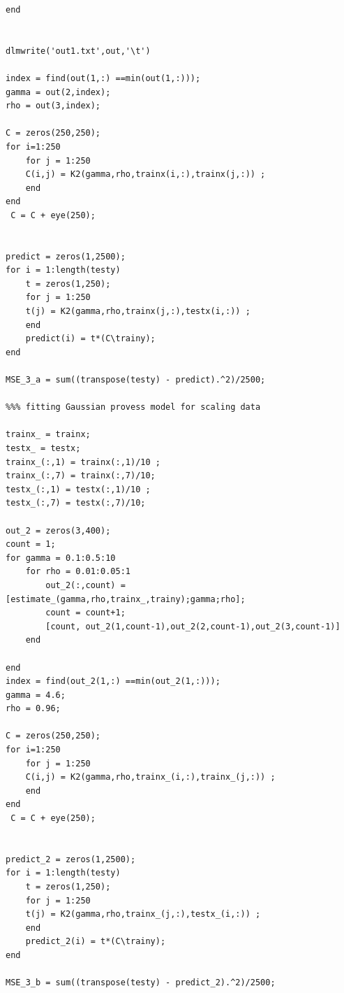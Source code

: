 \documentclass[12pt]{article}
\begin{document}
\begin{verbatim}
end


dlmwrite('out1.txt',out,'\t')

index = find(out(1,:) ==min(out(1,:)));
gamma = out(2,index);
rho = out(3,index);

C = zeros(250,250);
for i=1:250
    for j = 1:250
    C(i,j) = K2(gamma,rho,trainx(i,:),trainx(j,:)) ;
    end   
end
 C = C + eye(250);
 

predict = zeros(1,2500);
for i = 1:length(testy)
    t = zeros(1,250);
    for j = 1:250
    t(j) = K2(gamma,rho,trainx(j,:),testx(i,:)) ;
    end
    predict(i) = t*(C\trainy);
end

MSE_3_a = sum((transpose(testy) - predict).^2)/2500;

%%% fitting Gaussian provess model for scaling data

trainx_ = trainx;
testx_ = testx;
trainx_(:,1) = trainx(:,1)/10 ;
trainx_(:,7) = trainx(:,7)/10;
testx_(:,1) = testx(:,1)/10 ;
testx_(:,7) = testx(:,7)/10;

out_2 = zeros(3,400);
count = 1;
for gamma = 0.1:0.5:10
    for rho = 0.01:0.05:1
        out_2(:,count) = [estimate_(gamma,rho,trainx_,trainy);gamma;rho];
        count = count+1;
        [count, out_2(1,count-1),out_2(2,count-1),out_2(3,count-1)]
    end

end
index = find(out_2(1,:) ==min(out_2(1,:)));
gamma = 4.6;
rho = 0.96;

C = zeros(250,250);
for i=1:250
    for j = 1:250
    C(i,j) = K2(gamma,rho,trainx_(i,:),trainx_(j,:)) ;
    end   
end
 C = C + eye(250);
 

predict_2 = zeros(1,2500);
for i = 1:length(testy)
    t = zeros(1,250);
    for j = 1:250
    t(j) = K2(gamma,rho,trainx_(j,:),testx_(i,:)) ;
    end
    predict_2(i) = t*(C\trainy);
end

MSE_3_b = sum((transpose(testy) - predict_2).^2)/2500;


\end{verbatim}
\end{document}
